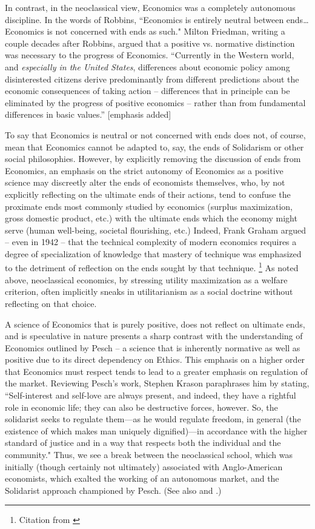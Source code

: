 \documentclass{article}
\begin{document}
In contrast, in the neoclassical view, Economics was a completely autonomous discipline.  In the words of Robbins, ``Economics is entirely neutral between ends…  Economics is not concerned with ends as such." \citep[p. 24]{robbins1932}  Milton Friedman, writing a couple decades after Robbins, argued that a positive vs. normative distinction was necessary to the progress of Economics.  ``Currently in the Western world, and \emph{especially in the United States}, differences about economic policy among disinterested citizens derive predominantly from different predictions about the economic consequences of taking action – differences that in principle can be eliminated by the progress of positive economics – rather than from fundamental differences in basic values.” [emphasis added] \citep[p. 5]{friedman1953}\medskip

To say that Economics is neutral or not concerned with ends does not, of course, mean that Economics cannot be adapted to, say, the ends of Solidarism or other social philosophies.  However, by explicitly removing the discussion of ends from Economics, an emphasis on the strict autonomy of Economics as a positive science may discreetly alter the ends of economists themselves, who, by not explicitly reflecting on the ultimate ends of their actions, tend to confuse the proximate ends most commonly studied by economics (surplus maximization, gross domestic product, etc.) with the ultimate ends which the economy might serve (human well-being, societal flourishing, etc.)  Indeed, Frank Graham argued – even in 1942 – that the technical complexity of modern economics requires a degree of specialization of knowledge that mastery of technique was emphasized to the detriment of reflection on the ends sought by that technique. \citep[p. 29]{graham1999}\footnote{Citation from \citet{yuengert2004}}  As noted above, neoclassical economics, by stressing utility maximization as a welfare criterion, often implicitly sneaks in utilitarianism as a social doctrine without reflecting on that choice.\medskip

A science of Economics that is purely positive, does not reflect on ultimate ends, and is speculative in nature presents a sharp contrast with the understanding of Economics outlined by Pesch – a science that is inherently normative as well as positive due to its direct dependency on Ethics.  This emphasis on a higher order that Economics must respect tends to lead to a greater emphasis on regulation of the market.  Reviewing Pesch’s work, Stephen Krason paraphrases him by stating, ``Self-interest and self-love are always present, and indeed, they have a rightful role in economic life; they can also be destructive forces, however. So, the solidarist seeks to regulate them—as he would regulate freedom, in general (the existence of which makes man uniquely dignified)—in accordance with the higher standard of justice and in a way that respects both the individual and the community." \citep{krason2009}  Thus, we see a break between the neoclassical school, which was initially (though certainly not ultimately) associated with Anglo-American economists, which exalted the working of an autonomous market, and the Solidarist approach championed by Pesch.  (See also \citet{mulcahy1951} and \citet{yenni1951}.) \medskip
\end{document}
